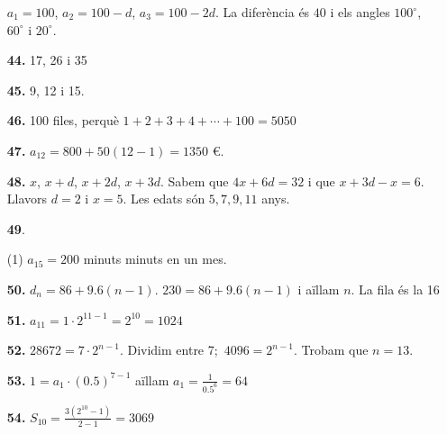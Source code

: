 \documentclass[a4paper, pdf, twoside]{book}
\begin{document}
\begin{multicols}{2}
\begin{enumerate}
$a_1=100$, $a_2=100-d$, $a_3=100-2d$. La diferència és $40$ i els angles $100^\circ $, $60^\circ $ i $20^\circ $.
\vspace{0.25cm}
\item[\fontfamily{phv}\selectfont\color{blue}\textbf{44. }] 
17, 26 i 35
\vspace{0.25cm}
\item[\fontfamily{phv}\selectfont\color{blue}\textbf{45. }] 
9, 12 i 15.
\vspace{0.25cm}
\item[\fontfamily{phv}\selectfont\color{blue}\textbf{46. }] 
100 files, perquè $1+2+3+4+\cdots +100=5050$
\vspace{0.25cm}
\item[\fontfamily{phv}\selectfont\color{blue}\textbf{47. }] 
$a_{12}=800+50 (12-1)=1350$ \euro {}.
\vspace{0.25cm}
\item[\fontfamily{phv}\selectfont\color{blue}\textbf{48. }] 
$x$, $x+d$, $x+2d$, $x+3d$. Sabem que $4x+6d=32$ i que $x+3d-x=6$. Llavors $d=2$ i $x=5$. Les edats són $5, 7, 9, 11$ anys.
\vspace{0.25cm}



 \item[\fontfamily{phv}\selectfont\color{blue}\textbf{49}. ] 
 \begin{tasks}[column-sep=1em, item-indent=1.3333em](1)
	 \task $a_{15} = 200$ minuts
	  minuts en un mes.
\end{tasks}
\vspace{0.25cm}
\item[\fontfamily{phv}\selectfont\color{blue}\textbf{50. }] 
$d_n=86+9.6(n-1)$. $230=86+9.6(n-1)$ i aïllam $n$. La fila és la 16
\vspace{0.25cm}
\item[\fontfamily{phv}\selectfont\color{blue}\textbf{51. }] 
$a_{11}=1\cdot 2^{11-1}=2^{10}=1024$
\vspace{0.25cm}
\item[\fontfamily{phv}\selectfont\color{blue}\textbf{52. }] 
$28672=7\cdot 2^{n-1}$. Dividim entre 7;\, $4096=2^{n-1}$. Trobam que $n=13$.
\vspace{0.25cm}
\item[\fontfamily{phv}\selectfont\color{blue}\textbf{53. }] 
$1=a_1 \cdot (0.5)^{7-1}$ aïllam $a_1 = \frac {1}{0.5^6}=64$
\vspace{0.25cm}
\item[\fontfamily{phv}\selectfont\color{blue}\textbf{54. }] 
$S_{10}=\frac {3 (2^{10}-1)}{2-1}=3069$
 \end{enumerate}
\vspace{0.3cm}


\end{multicols}
\end{document}
